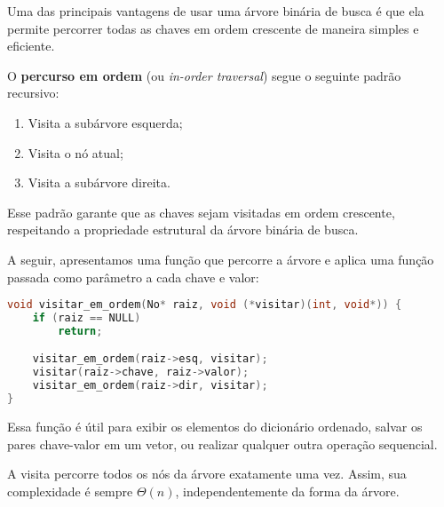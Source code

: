 Uma das principais vantagens de usar uma árvore binária de busca é que ela permite percorrer todas as chaves em ordem crescente de maneira simples e eficiente.

O \textbf{percurso em ordem} (ou \emph{in-order traversal}) segue o seguinte padrão recursivo:

\begin{enumerate}
  \item Visita a subárvore esquerda;
  \item Visita o nó atual;
  \item Visita a subárvore direita.
\end{enumerate}

Esse padrão garante que as chaves sejam visitadas em ordem crescente, respeitando a propriedade estrutural da árvore binária de busca.

A seguir, apresentamos uma função que percorre a árvore e aplica uma função passada como parâmetro a cada chave e valor:

\begin{lstlisting}[language=C, caption={Percurso em ordem em ABB}]
void visitar_em_ordem(No* raiz, void (*visitar)(int, void*)) {
    if (raiz == NULL)
        return;

    visitar_em_ordem(raiz->esq, visitar);
    visitar(raiz->chave, raiz->valor);
    visitar_em_ordem(raiz->dir, visitar);
}
\end{lstlisting}

Essa função é útil para exibir os elementos do dicionário ordenado, salvar os pares chave-valor em um vetor, ou realizar qualquer outra operação sequencial.

A visita percorre todos os nós da árvore exatamente uma vez. 
Assim, sua complexidade é sempre $\Theta(n)$, independentemente da forma da árvore. 
